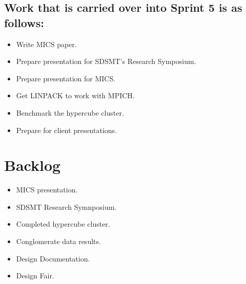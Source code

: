 \documentclass{article}
\begin{document}
\subsection*{Work that is carried over into Sprint 5 is as follows:}
\begin{itemize}
	\item Write MICS paper.
	\item Prepare presentation for SDSMT's Research Symposium.
	\item Prepare presentation for MICS.
	\item Get LINPACK to work with MPICH.
	\item Benchmark the hypercube cluster.
	\item Prepare for client presentations.
\end{itemize}

\section*{Backlog}
\begin{itemize}
	\item MICS presentation.
	\item SDSMT Research Symnposium.
	\item Completed hypercube cluster.
	\item Conglomerate data results.
	\item Design Documentation.
	\item Design Fair.
\end{itemize}
\end{document}
